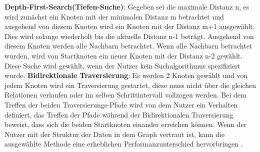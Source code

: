 \textbf {Depth-First-Search(Tiefen-Suche)}: Gegeben sei die maximale Distanz n, es wird zunächst ein Knoten mit der minimalen Distanz m betrachtet und ausgehend von diesem Knoten wird ein Knoten mit der Distanz m+1 ausgewählt. Dies wird solange wiederholt bis die aktuelle Distanz n-1 beträgt. Ausgehend von diesem Knoten werden alle Nachbarn betrachtet. Wenn alle Nachbarn betrachtet wurden, wird von Startknoten ein neuer Knoten mit der Distanz n-2 gewählt. Diese Suche wird gewählt, wenn der Nutzer kein Suchalgorithmus spezifiziert wurde. \newline
\textbf {Bidirektionale Traversierung}: Es werden 2 Knoten gewählt und von jedem Knoten wird ein Traversierung gestartet, diese muss nicht über die gleichen Relationen verlaufen oder im selben Schrittintervall vollzogen werden. Bei dem Treffen der beiden Traversierungs-Pfade wird von dem Nutzer ein Verhalten definiert, das Treffen der Pfade während der Bidirektionalen Traversierung beweist, dass sich die beiden Startknoten einander erreichen können.
\newline
\newline
Wenn der Nutzer mit der Struktur der Daten in dem Graph vertraut ist, kann die ausgewählte Methode eine erheblichen Performanzunterschied  hervorbringen \parencite{vukotic2015neo4j}. 

